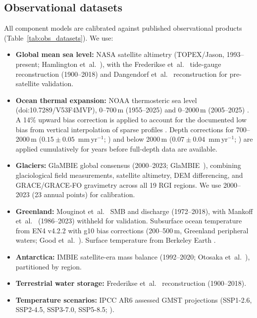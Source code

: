 \documentclass[12pt]{article}
\begin{document}
\subsection{Observational datasets}

All component models are calibrated against published observational products (Table~\ref{tab:obs_datasets}). We use:
\begin{itemize}
\item \textbf{Global mean sea level:} NASA satellite altimetry (TOPEX/Jason, 1993--present; Hamlington et~al.~\cite{Hamlington2020}), with the Frederikse et~al.~\citep{Frederikse2020} tide-gauge reconstruction (1900--2018) and Dangendorf et~al.~\citep{Dangendorf2019} reconstruction for pre-satellite validation.
\item \textbf{Ocean thermal expansion:} NOAA thermosteric sea level (doi:10.7289/V53F4MVP), 0--700\,m (1955--2025) and 0--2000\,m (2005--2025) \citep{Levitus2012}. A 14\% upward bias correction is applied to account for the documented low bias from vertical interpolation of sparse profiles \citep{Li2022}. Depth corrections for 700--2000\,m ($0.15 \pm 0.05$~mm\,yr$^{-1}$; \cite{Levitus2012, Cheng2017}) and below 2000\,m ($0.07 \pm 0.04$~mm\,yr$^{-1}$; \cite{Purkey2010, Desbruyeres2016}) are applied cumulatively for years before full-depth data are available.
\item \textbf{Glaciers:} GlaMBIE global consensus (2000--2023; GlaMBIE~\cite{GlaMBIE2025}), combining glaciological field measurements, satellite altimetry, DEM differencing, and GRACE/GRACE-FO gravimetry across all 19 RGI regions. We use 2000--2023 (23 annual points) for calibration.
\item \textbf{Greenland:} Mouginot et~al.~\citep{Mouginot2019} SMB and discharge (1972--2018), with Mankoff et~al.~\citep{Mankoff2021} (1986--2023) withheld for validation. Subsurface ocean temperature from EN4 v4.2.2 with g10 bias corrections (200--500\,m, Greenland peripheral waters; Good et~al.~\cite{Good2013}). Surface temperature from Berkeley Earth \citep{Rohde2020}.
\item \textbf{Antarctica:} IMBIE satellite-era mass balance (1992--2020; Otosaka et~al.~\cite{Otosaka2023}), partitioned by region.
\item \textbf{Terrestrial water storage:} Frederikse et~al.~\citep{Frederikse2020} reconstruction (1900--2018).
\item \textbf{Temperature scenarios:} IPCC AR6 assessed GMST projections (SSP1-2.6, SSP2-4.5, SSP3-7.0, SSP5-8.5; \cite{Lee2021}).
\end{itemize}
\end{document}
